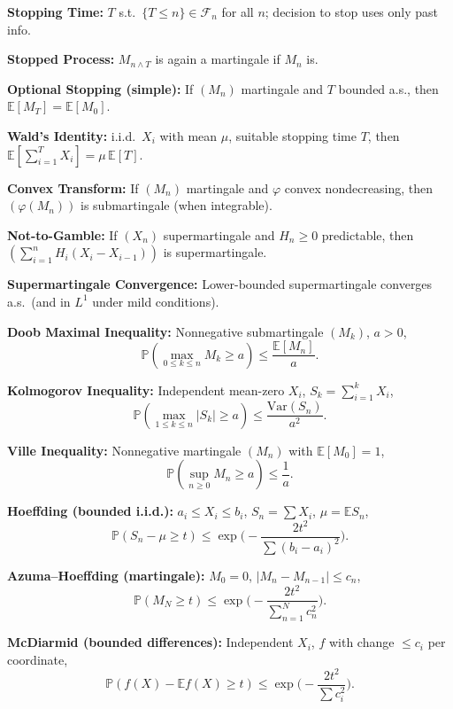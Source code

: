 \documentclass[answers,12pt,addpoints]{exam}
\begin{document}
\textbf{Stopping Time:}
$T$ s.t.\ $\{T\le n\}\in\mathcal{F}_n$ for all $n$; decision to stop uses only past info.  

\textbf{Stopped Process:}
$M_{n\wedge T}$ is again a martingale if $M_n$ is.  

\textbf{Optional Stopping (simple):}
If $(M_n)$ martingale and $T$ bounded a.s., then $\mathbb{E}[M_T]=\mathbb{E}[M_0]$.  

\textbf{Wald's Identity:}
i.i.d.\ $X_i$ with mean $\mu$, suitable stopping time $T$, then $\mathbb{E}\!\left[\sum_{i=1}^T X_i\right]=\mu\,\mathbb{E}[T]$.  

\textbf{Convex Transform:}
If $(M_n)$ martingale and $\varphi$ convex nondecreasing, then $(\varphi(M_n))$ is submartingale (when integrable).  

\textbf{Not-to-Gamble:}
If $(X_n)$ supermartingale and $H_n\ge0$ predictable, then $(\sum_{i=1}^n H_i(X_i-X_{i-1}))$ is supermartingale.  

\textbf{Supermartingale Convergence:}
Lower-bounded supermartingale converges a.s.\ (and in $L^1$ under mild conditions).  


\textbf{Doob Maximal Inequality:}
Nonnegative submartingale $(M_k)$, $a>0$,
\[
\mathbb{P}\!\left(\max_{0\le k\le n}M_k \ge a\right)\le \frac{\mathbb{E}[M_n]}{a}.
\]

\textbf{Kolmogorov Inequality:}
Independent mean-zero $X_i$, $S_k=\sum_{i=1}^k X_i$,
\[
\mathbb{P}\!\left(\max_{1\le k\le n}|S_k|\ge a\right)\le \frac{\mathrm{Var}(S_n)}{a^2}.
\]

\textbf{Ville Inequality:}
Nonnegative martingale $(M_n)$ with $\mathbb{E}[M_0]=1$,
\[
\mathbb{P}\!\left(\sup_{n\ge0}M_n\ge a\right)\le \frac{1}{a}.
\]


\textbf{Hoeffding (bounded i.i.d.):}
$a_i\le X_i\le b_i$, $S_n=\sum X_i$, $\mu=\mathbb{E}S_n$,
\[
\mathbb{P}(S_n-\mu\ge t)\le \exp\!\Big(-\frac{2t^2}{\sum (b_i-a_i)^2}\Big).
\]

\textbf{Azuma–Hoeffding (martingale):}
$M_0=0$, $|M_n-M_{n-1}|\le c_n$,
\[
\mathbb{P}(M_N\ge t)\le \exp\!\Big(-\frac{2t^2}{\sum_{n=1}^N c_n^2}\Big).
\]

\textbf{McDiarmid (bounded differences):}
Independent $X_i$, $f$ with change $\le c_i$ per coordinate,
\[
\mathbb{P}(f(X)-\mathbb{E}f(X)\ge t)\le \exp\!\Big(-\frac{2t^2}{\sum c_i^2}\Big).
\]
\end{document}
